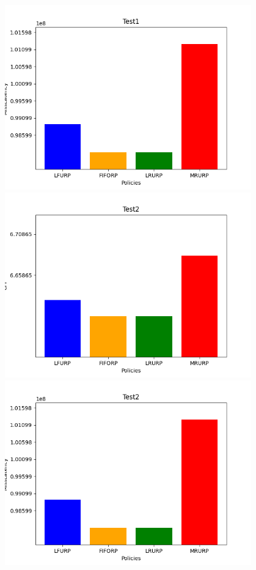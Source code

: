 ‫\includegraphics[width=0.8\textwidth]{graph/csv1Miss.png}\\
‫\includegraphics[width=0.8\textwidth]{graph/csv2CPI.png}\\
‫\includegraphics[width=0.8\textwidth]{graph/csv2Miss.png}\\
